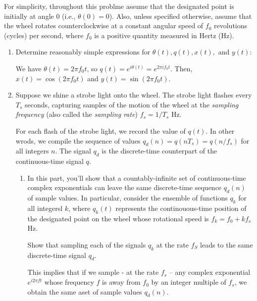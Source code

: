 \documentclass[10pt]{article}
\begin{document}
	For simplicity, throughout this problme assume that the designated point is initially at angle 
	0 (i.e.,  \( \theta(0) = 0 \)). Also, unless specified otherwise, assume that the wheel rotates counterclockwise
	at a constant angular speed of \( f_0 \) revolutions (cycles) per second, where \( f_0 \) is a positive 
	quantity measured in Hertz (Hz).

	\begin{enumerate}[label=\alph*)]
		\item Determine reasonably simple expressions for \( \theta(t), q(t), x(t), \) and \( y(t) \):
			\begin{solution}
				We have \( \theta(t) = 2\pi f_0t\), so \( q(t) = e^{i \theta(t)} = e^{2 \pi i f_0 t} \). 
				Then, \( x(t) = \cos(2 \pi f_0 t) \) and \( y(t) = \sin(2 \pi f_0 t) \).
			\end{solution}
		\item Suppose we shine a strobe light onto the wheel. The strobe light flashes every \( T_s \) seconds, 
			capturing samples of the motion of the wheel at the \textit{sampling frequency} (also called the 
			\textit{sampling rate}) \( f_s = 1 / T_s \) Hz. 

			For each flash of the strobe light, we record the value of \( q(t) \). In other wrods, we compile 
			the sequence of values \( q_d(n) = q(nT_s) = q(n / f_s)\) for all integers \( n \). The signal 
			\( q_d \) is the discrete-time counterpart of the continuous-time signal \( q \).

			\begin{enumerate}[label=\Roman*)]
				\item In this part, you'll show that a countably-infinite set of continuous-time complex 
					exponentials can leave the same discrete-time sequence \( q_d(n) \) of sample values. In 
					particular, consider the ensemble of functions \( q_k \) for all 
					integersl \( k \), where \( q_k(t) \) represents the continouous-time position of the designated 
					point on the wheel whose rotational speed is  \( f_k = f_0 + kf_s\) Hz. 

					Show that sampling each of the signals \( q_k \) at the rate \( f_S \) leads to the same 
					discrete-time signal \( q_d \). 

					This implies that if we sample - at the rate \( f_s \) -- any complex exponential 
					\( e^{i 2\pi ft} \) whose frequency \( f \) is away from \( f_0 \) by an integer 
					multiple of \( f_s \), we obtain the same aset of sample values \( q_d(n) \). 


\end{enumerate}
\end{enumerate}
\end{document}
